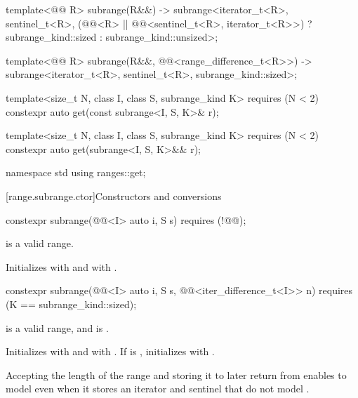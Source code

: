 \begin{codeblock}
{  template<@@ R>
    subrange(R&&) ->
      subrange<iterator_t<R>, sentinel_t<R>,
               (@@<R> || @@<sentinel_t<R>, iterator_t<R>>)
                 ? subrange_kind::sized : subrange_kind::unsized>;

  template<@@ R>
    subrange(R&&, @@<range_difference_t<R>>) ->
      subrange<iterator_t<R>, sentinel_t<R>, subrange_kind::sized>;

  template<size_t N, class I, class S, subrange_kind K>
    requires (N < 2)
    constexpr auto get(const subrange<I, S, K>& r);

  template<size_t N, class I, class S, subrange_kind K>
    requires (N < 2)
    constexpr auto get(subrange<I, S, K>&& r);
}

namespace std {
  using ranges::get;
}
\end{codeblock}

[range.subrange.ctor]{Constructors and conversions}

%
\begin{itemdecl}
constexpr subrange(@@<I> auto i, S s) requires (!@@);
\end{itemdecl}

\begin{itemdescr}
\pnum
\expects
{} is a valid range.

\pnum
\effects
Initializes  with  and  with
.
\end{itemdescr}

%
\begin{itemdecl}
constexpr subrange(@@<I> auto i, S s,
                   @@<iter_difference_t<I>> n)
  requires (K == subrange_kind::sized);
\end{itemdecl}

\begin{itemdescr}
\pnum
\expects
{} is a valid range, and
is .

\pnum
\effects
Initializes  with  and  with
. If  is , initializes  with
.

\pnum
\begin{note}
Accepting the length of the range and storing it to later return  from
 enables  to model  even
when it stores an iterator and sentinel that do not model
.
\end{note}
\end{itemdescr}

